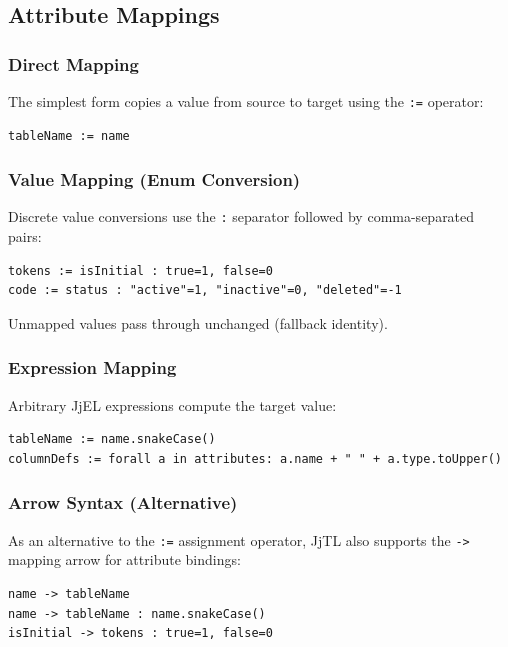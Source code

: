 \documentclass[11pt,a4paper]{article}
\newcommand{\jjel}{\textsf{JjEL}}
\newcommand{\jjtl}{\textsf{JjTL}}
\begin{document}
\subsection{Attribute Mappings}

\subsubsection{Direct Mapping}

The simplest form copies a value from source to target using the \texttt{:=} operator:
\begin{lstlisting}[style=jjtl,numbers=none]
tableName := name
\end{lstlisting}

\subsubsection{Value Mapping (Enum Conversion)}

Discrete value conversions use the \texttt{:} separator followed by comma-separated pairs:
\begin{lstlisting}[style=jjtl,numbers=none]
tokens := isInitial : true=1, false=0
code := status : "active"=1, "inactive"=0, "deleted"=-1
\end{lstlisting}

Unmapped values pass through unchanged (fallback identity).

\subsubsection{Expression Mapping}

Arbitrary \jjel{} expressions compute the target value:
\begin{lstlisting}[style=jjtl,numbers=none]
tableName := name.snakeCase()
columnDefs := forall a in attributes: a.name + " " + a.type.toUpper()
\end{lstlisting}

\subsubsection{Arrow Syntax (Alternative)}

As an alternative to the \texttt{:=} assignment operator, \jjtl{} also supports the \texttt{->} mapping arrow for attribute bindings:
\begin{lstlisting}[style=jjtl,numbers=none]
name -> tableName
name -> tableName : name.snakeCase()
isInitial -> tokens : true=1, false=0
\end{lstlisting}
\end{document}
